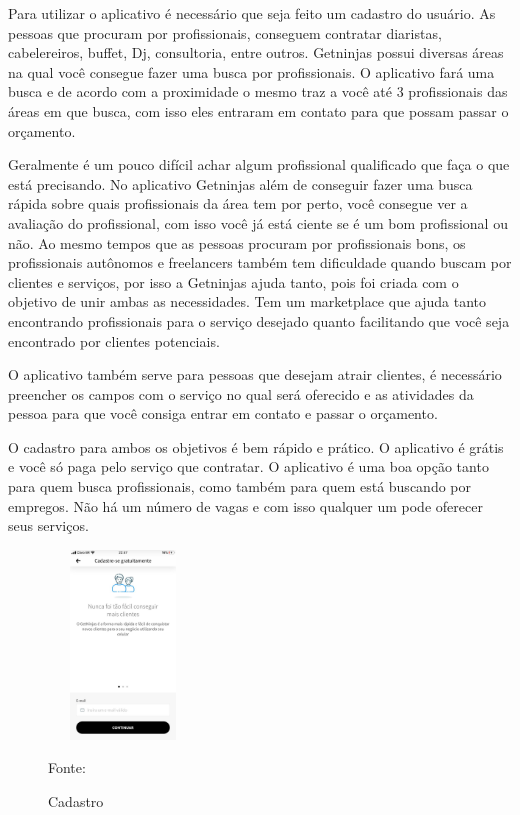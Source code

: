 Para utilizar o aplicativo é necessário que seja feito um cadastro do usuário. As pessoas que procuram por profissionais, conseguem contratar diaristas, cabelereiros, buffet, Dj, consultoria, entre outros. Getninjas possui diversas áreas na qual você consegue fazer uma busca por profissionais. O aplicativo fará uma busca e de acordo com a proximidade o mesmo traz a você até 3 profissionais das áreas em que busca, com isso eles entraram em contato para que possam passar o orçamento.

Geralmente é um pouco difícil achar algum profissional qualificado que faça o que está precisando. No aplicativo Getninjas além de conseguir fazer uma busca rápida sobre quais profissionais da área tem por perto, você consegue ver a avaliação do profissional, com isso você já está ciente se é um bom profissional ou não. Ao mesmo tempos que as pessoas procuram por profissionais bons, os profissionais autônomos e freelancers também tem dificuldade quando buscam por clientes e serviços, por isso a Getninjas ajuda tanto, pois foi criada com o objetivo de unir ambas as necessidades. Tem um marketplace que ajuda tanto encontrando profissionais para o serviço desejado quanto facilitando que você seja encontrado por clientes potenciais.

O aplicativo também serve para pessoas que desejam atrair clientes, é necessário preencher os campos com o serviço no qual será oferecido e as atividades da pessoa para que você consiga entrar em contato e passar o orçamento.

O cadastro para ambos os objetivos é bem rápido e prático. O aplicativo é grátis e você só paga pelo serviço que contratar. O aplicativo é uma boa opção tanto para quem busca profissionais, como também para quem está buscando por empregos. Não há um número de vagas e com isso qualquer um pode oferecer seus serviços.


\begin{figure}[!h]
	\centering
		
	\caption{Cadastro }
	\includegraphics[width=150px, height=190px]{./images/getNinjasMobile.jpeg}
	\label{fig:get1}
	\par {Fonte: \cite{get-ninjasMobilea}}
\end{figure}

